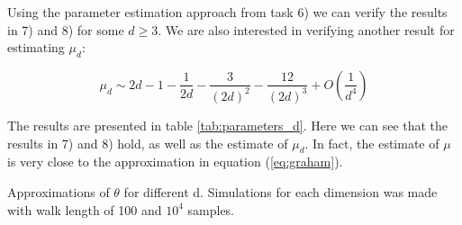 \documentclass[a4paper]{article}
\begin{document}
Using the parameter estimation approach from task 6) we can verify the results in 7) and 8) for some $d\geq 3$. We are also interested in verifying another result for estimating $\mu_d$:

\begin{equation}
    \label{eq:graham}
\mu_d \sim 2d-1-\frac{1}{2d} - \frac{3}{(2d)^2} - \frac{12}{(2d)^3} + O(\frac{1}{d^4})
\end{equation}

The results are presented in table \ref{tab:parameters_d}. Here we can see that the results in 7) and 8) hold, as well as the estimate of $\mu_d$. In fact, the estimate of $\mu$ is very close to the approximation in equation (\ref{eq:graham}).

\begin{table}[H]
    \centering
    \caption{Approximations of $\theta$ for different d. Simulations for each dimension was made with walk length of 100 and $10^4$ samples.}
    \label{tab:parameters_d}
    
\end{table}
\end{document}
